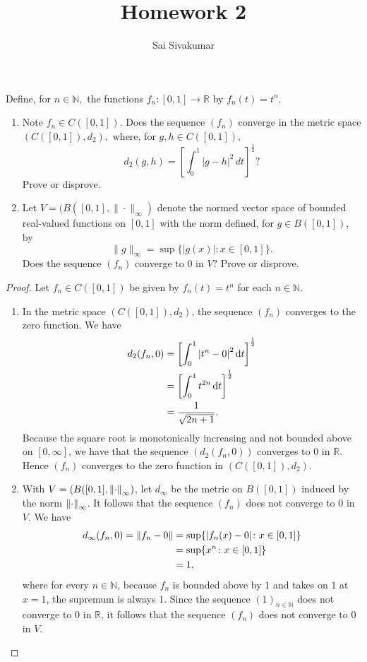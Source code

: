 \documentclass[12pt]{amsart}
\title{Homework 2}
\author{Sai Sivakumar}
\newcommand{\RR}{\mathbb{R}}
\newcommand{\NN}{\mathbb{N}}
\begin{document}
\maketitle


   Define, for $n\in \NN,$ the functions $f_n:[0,1]\to\RR$ by 
 $f_n(t)=t^n.$ 
\begin{enumerate}\itemsep=12pt
\item  Note $f_n\in C([0,1]).$
 Does the sequence
 $(f_n)$ converge in the metric space $(C([0,1]),d_2),$ where,
 for $g,h\in C([0,1]),$
\[
 d_2(g,h) = \left [  \int_0^1 |g-h|^2\, dt  \right ]^\frac12?
\]
Prove or disprove.
\item Let $V=(B([0,1],\|\cdot\|_\infty)$ denote the normed vector space 
 of bounded real-valued functions on $[0,1]$ with the norm
 defined, for $g\in B([0,1]),$ by
\[
  \|g\|_\infty =\sup\{|g(x)|: x\in [0,1]\}.
\]
 Does the sequence $(f_n)$ converge to $0$ in $V?$ Prove or disprove.
\end{enumerate}

\begin{proof} Let $f_n\in C([0,1])$ be given by $f_n(t) = t^n$ for each $n\in \mathbb{N}$.
  \begin{enumerate}
  \item In the metric space $(C([0,1]), d_2)$, the sequence $(f_n)$ converges to the zero function.
  We have \begin{align*}
    d_2(f_n,0) &= \left [ \int_0^1 \abs{t^n-0}^2\dd{t} \right ]^{\frac{1}{2}}\\
    &= \left [ \int_0^1 t^{2n}\dd{t} \right ]^{\frac{1}{2}}\\
    &= \frac{1}{\sqrt{2n+1}}.
  \end{align*} 
  Because the square root is monotonically increasing and not bounded above on $[0,\infty]$, we have that the sequence $(d_2(f_n,0))$ converges to $0$ in $\mathbb{R}$. Hence $(f_n)$ converges to the zero function in $(C([0,1]), d_2)$.
  \item With $V = (B([0,1],\norm{\cdot}_\infty)$, let $d_\infty$ be the metric on $B([0,1])$ induced by the norm $\norm{\cdot}_\infty$. It follows that the sequence $(f_n)$ does not converge to $0$ in $V$. We have \begin{align*}
    d_\infty(f_n,0) = \norm{f_n-0} &= \sup\{\abs{f_n(x)-0}\colon x\in [0,1]\}\\
    &= \sup\{x^n\colon x\in[0,1]\}\\
    &= 1,
  \end{align*} where for every $n\in \mathbb{N}$, because $f_n$ is bounded above by $1$ and takes on $1$ at $x=1$, the supremum is always $1$. Since the sequence $(1)_{n\in\mathbb{N}}$ does not converge to $0$ in $\mathbb{R}$, it follows that the sequence $(f_n)$ does not converge to $0$ in $V$.
\end{enumerate}
\end{proof}
\end{document}
